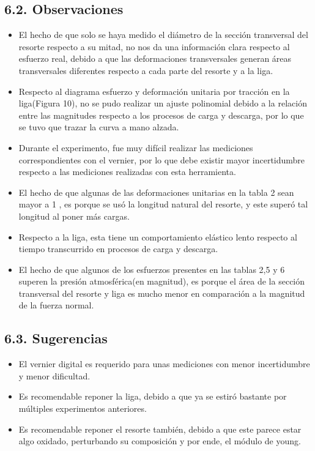 \documentclass[10pt]{article}
\begin{document}
\subsection*{6.2. Observaciones}
\begin{itemize}
  \item El hecho de que solo se haya medido el diámetro de la sección transversal del resorte respecto a su mitad, no nos da una información clara respecto al esfuerzo real, debido a que las deformaciones transversales generan áreas transversales diferentes respecto a cada parte del resorte y a la liga.
  \item Respecto al diagrama esfuerzo y deformación unitaria por tracción en la liga(Figura 10), no se pudo realizar un ajuste polinomial debido a la relación entre las magnitudes respecto a los procesos de carga y descarga, por lo que se tuvo que trazar la curva a mano alzada.
  \item Durante el experimento, fue muy difícil realizar las mediciones correspondientes con el vernier, por lo que debe existir mayor incertidumbre respecto a las mediciones realizadas con esta herramienta.
  \item El hecho de que algunas de las deformaciones unitarias en la tabla 2 sean mayor a 1 , es porque se usó la longitud natural del resorte, y este superó tal longitud al poner más cargas.
  \item Respecto a la liga, esta tiene un comportamiento elástico lento respecto al tiempo transcurrido en procesos de carga y descarga.
  \item El hecho de que algunos de los esfuerzos presentes en las tablas 2,5 y 6 superen la presión atmosférica(en magnitud), es porque el área de la sección transversal del resorte y liga es mucho menor en comparación a la magnitud de la fuerza normal.
\end{itemize}

\subsection*{6.3. Sugerencias}
\begin{itemize}
  \item El vernier digital es requerido para unas mediciones con menor incertidumbre y menor dificultad.
  \item Es recomendable reponer la liga, debido a que ya se estiró bastante por múltiples experimentos anteriores.
  \item Es recomendable reponer el resorte también, debido a que este parece estar algo oxidado, perturbando su composición y por ende, el módulo de young.
\end{itemize}
\end{document}
